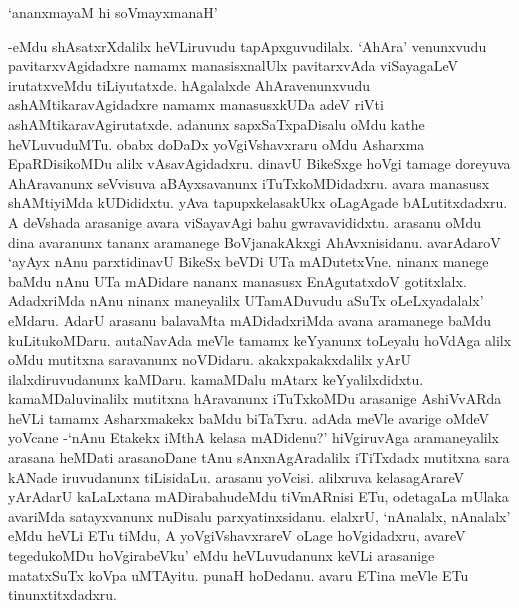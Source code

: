 \begin{shloka}
`ananxmayaM hi soVmayxmanaH'
\end{shloka}

-eMdu shAsatxrXdalilx heVLiruvudu tapApxguvudilalx. `AhAra' venunxvudu pavitarxvAgidadxre namamx manasisxnalUlx pavitarxvAda viSayagaLeV irutatxveMdu tiLiyutatxde. hAgalalxde AhAravenunxvudu ashAMtikaravAgidadxre namamx manasusxkUDa adeV riVti ashAMtikaravAgirutatxde. adanunx sapxSaTxpaDisalu oMdu kathe heVLuvuduMTu. obabx doDaDx yoVgiVshavxraru oMdu Asharxma EpaRDisikoMDu alilx vAsavAgidadxru. dinavU BikeSxge hoVgi tamage doreyuva AhAravanunx seVvisuva aBAyxsavanunx iTuTxkoMDidadxru. avara manasusx shAMtiyiMda kUDididxtu. yAva tapupxkelasakUkx oLagAgade bALutitxdadxru. A deVshada arasanige avara viSayavAgi bahu gwravavididxtu. arasanu oMdu dina avaranunx tananx aramanege BoVjanakAkxgi AhAvxnisidanu. avarAdaroV `ayAyx nAnu parxtidinavU BikeSx beVDi UTa mADutetxVne. ninanx manege baMdu nAnu UTa mADidare nananx manasusx EnAgutatxdoV gotitxlalx. AdadxriMda nAnu ninanx maneyalilx UTamADuvudu aSuTx oLeLxyadalalx' eMdaru. AdarU arasanu balavaMta mADidadxriMda avana aramanege baMdu kuLitukoMDaru. autaNavAda meVle tamamx keYyanunx toLeyalu hoVdAga alilx oMdu mutitxna saravanunx noVDidaru. akakxpakakxdalilx yArU ilalxdiruvudanunx kaMDaru. kamaMDalu mAtarx keYyalilxdidxtu. kamaMDaluvinalilx mutitxna hAravanunx iTuTxkoMDu arasanige AshiVvARda heVLi tamamx Asharxmakekx baMdu biTaTxru. adAda meVle avarige oMdeV yoVcane -`nAnu Etakekx iMthA kelasa mADidenu?' hiVgiruvAga aramaneyalilx arasana heMDati arasanoDane tAnu sAnxnAgAradalilx iTiTxdadx mutitxna sara kANade iruvudanunx tiLisidaLu. arasanu yoVcisi. alilxruva kelasagArareV yArAdarU kaLaLxtana mADirabahudeMdu tiVmARnisi ETu, odetagaLa mUlaka avariMda satayxvanunx nuDisalu parxyatinxsidanu. elalxrU, `nAnalalx, nAnalalx' eMdu heVLi ETu tiMdu, A yoVgiVshavxrareV oLage hoVgidadxru, avareV tegedukoMDu hoVgirabeVku' eMdu heVLuvudanunx keVLi arasanige matatxSuTx koVpa uMTAyitu. punaH hoDedanu. avaru ETina meVle ETu tinunxtitxdadxru.


